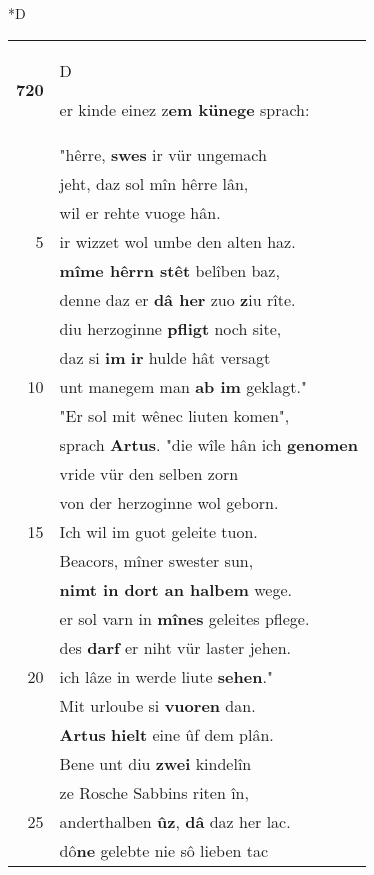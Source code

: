 \documentclass[8pt,a4paper,notitlepage]{article}
\begin{document}
\begin{table}[ht]
\begin{minipage}[t]{0.5\linewidth}
\small
\begin{center}*D
\end{center}
\begin{tabular}{rl}
\textbf{720} & \begin{large}D\end{large}er kinde einez z\textbf{em künege} sprach:\\ 
 & "hêrre, \textbf{swes} ir vür ungemach\\ 
 & jeht, daz sol mîn hêrre lân,\\ 
 & wil er rehte vuoge hân.\\ 
5 & ir wizzet wol umbe den alten haz.\\ 
 & \textbf{mîme hêrrn stêt} belîben baz,\\ 
 & denne daz er \textbf{dâ her} zuo \textbf{z}iu rîte.\\ 
 & diu herzoginne \textbf{pfligt} noch site,\\ 
 & daz si \textbf{im} \textbf{ir} hulde hât versagt\\ 
10 & unt manegem man \textbf{ab im} geklagt."\\ 
 & "Er sol mit wênec liuten komen",\\ 
 & sprach \textbf{Artus}. "die wîle hân ich \textbf{genomen}\\ 
 & vride vür den selben zorn\\ 
 & von der herzoginne wol geborn.\\ 
15 & Ich wil im guot geleite tuon.\\ 
 & Beacors, mîner swester sun,\\ 
 & \textbf{nimt in dort an halbem} wege.\\ 
 & er sol varn in \textbf{mînes} geleites pflege.\\ 
 & des \textbf{darf} er niht vür laster jehen.\\ 
20 & ich lâze in werde liute \textbf{sehen}."\\ 
 & Mit urloube si \textbf{vuoren} dan.\\ 
 & \textbf{Artus} \textbf{hielt} eine ûf dem plân.\\ 
 & Bene unt diu \textbf{zwei} kindelîn\\ 
 & ze Rosche Sabbins riten în,\\ 
25 & anderthalben \textbf{ûz}, \textbf{dâ} daz her lac.\\ 
 & dô\textbf{ne} gelebte nie sô lieben tac\\ 

\end{tabular}
\end{minipage}
\end{table}
\end{document}
